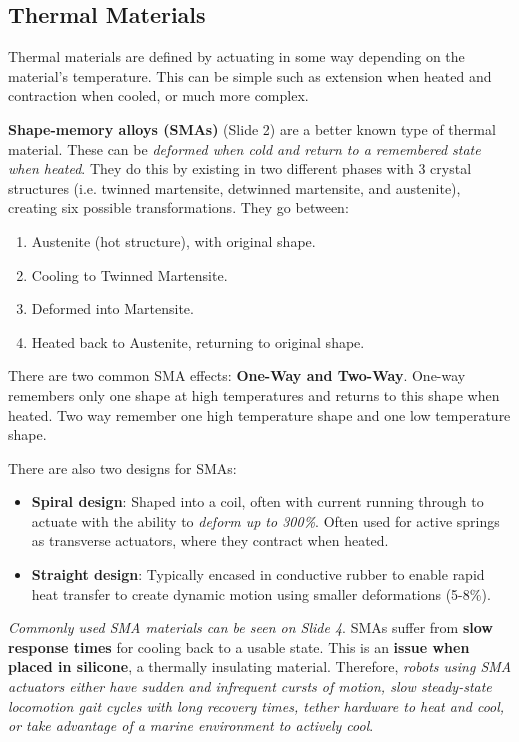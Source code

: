 \documentclass[onecolumn,a4paper]{article}
\begin{document}
\subsection{Thermal Materials}
Thermal materials are defined by actuating in some way depending on the material's temperature. This can be simple such as extension when heated and contraction when cooled, or much more complex.

\textbf{Shape-memory alloys (SMAs)} (Slide 2) are a better known type of thermal material. These can be \emph{deformed when cold and return to a remembered state when heated}. They do this by existing in two different phases with 3 crystal structures (i.e. twinned martensite, detwinned martensite, and austenite), creating six possible transformations. They go between:
\begin{enumerate}
    \item Austenite (hot structure), with original shape.
    \item Cooling to Twinned Martensite.
    \item Deformed into Martensite.
    \item Heated back to Austenite, returning to original shape.
\end{enumerate}
There are two common SMA effects: \textbf{One-Way and Two-Way}. One-way remembers only one shape at high temperatures and returns to this shape when heated. Two way remember one high temperature shape and one low temperature shape.

There are also two designs for SMAs:
\begin{itemize}
    \item \textbf{Spiral design}:
        Shaped into a coil, often with current running through to actuate with the ability to \emph{deform up to 300\%}. Often used for active springs as transverse actuators, where they contract when heated. 
    \item \textbf{Straight design}:
        Typically encased in conductive rubber to enable rapid heat transfer to create dynamic motion using smaller deformations (5-8\%).
\end{itemize}

\emph{Commonly used SMA materials can be seen on Slide 4}.  SMAs suffer from \textbf{slow response times} for cooling back to a usable state. This is an \textbf{issue when placed in silicone}, a thermally insulating material. Therefore, \emph{robots using SMA actuators either have sudden and infrequent cursts of motion, slow steady-state locomotion gait cycles with long recovery times, tether hardware to heat and cool, or take advantage of a marine environment to actively cool}.
\end{document}
